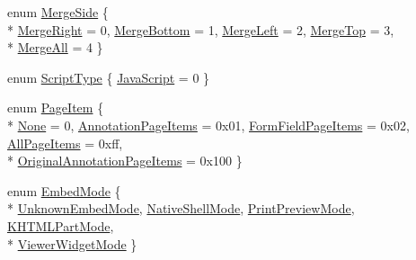 \begin{DoxyCompactItemize}
enum \hyperlink{namespaceOkular_ad98deec425adfb02ba05a78568bccceb}{Merge\+Side} \{ \\*
\hyperlink{namespaceOkular_ad98deec425adfb02ba05a78568bccceba809db1d0fade6720582a2c4f35299e5a}{Merge\+Right} = 0, 
\hyperlink{namespaceOkular_ad98deec425adfb02ba05a78568bccceba3b750f74fdec8486675e9ef46dfe7626}{Merge\+Bottom} = 1, 
\hyperlink{namespaceOkular_ad98deec425adfb02ba05a78568bcccebadd181d06ce9bf13ee34d11b136c891dc}{Merge\+Left} = 2, 
\hyperlink{namespaceOkular_ad98deec425adfb02ba05a78568bccceba7e844b878ae71c6724c6762f26b41b8e}{Merge\+Top} = 3, 
\\*
\hyperlink{namespaceOkular_ad98deec425adfb02ba05a78568bccceba7721ff1c43048d327e3809bdb53e8b9a}{Merge\+All} = 4
 \}
\item 
enum \hyperlink{namespaceOkular_a061f34ff835b2d2142fef28bcfd09325}{Script\+Type} \{ \hyperlink{namespaceOkular_a061f34ff835b2d2142fef28bcfd09325ac61eb96a387ac39266f6eb71948796ea}{Java\+Script} = 0
 \}
\item 
enum \hyperlink{namespaceOkular_ad8955fd515cc3f63a14cdff6723e6c1b}{Page\+Item} \{ \\*
\hyperlink{namespaceOkular_ad8955fd515cc3f63a14cdff6723e6c1ba6969c0e2e87cc779dae8be495740eda6}{None} = 0, 
\hyperlink{namespaceOkular_ad8955fd515cc3f63a14cdff6723e6c1bae381057ad4a79c350a0d4a9aaaaa995b}{Annotation\+Page\+Items} = 0x01, 
\hyperlink{namespaceOkular_ad8955fd515cc3f63a14cdff6723e6c1bac7554622ca47fc955ea25889b6637d3b}{Form\+Field\+Page\+Items} = 0x02, 
\hyperlink{namespaceOkular_ad8955fd515cc3f63a14cdff6723e6c1bad157628664d884c59d2cc11bcdddb76a}{All\+Page\+Items} = 0xff, 
\\*
\hyperlink{namespaceOkular_ad8955fd515cc3f63a14cdff6723e6c1ba1feb4fde97e57698f97d64a2a3b824bb}{Original\+Annotation\+Page\+Items} = 0x100
 \}
\item 
enum \hyperlink{namespaceOkular_adbe21e337d65d3f5f07a441180428ba8}{Embed\+Mode} \{ \\*
\hyperlink{namespaceOkular_adbe21e337d65d3f5f07a441180428ba8a3bb7ac1cc6c88ffdec148c8d6c53a811}{Unknown\+Embed\+Mode}, 
\hyperlink{namespaceOkular_adbe21e337d65d3f5f07a441180428ba8ae06451e28dfb108642b1c3a61a196145}{Native\+Shell\+Mode}, 
\hyperlink{namespaceOkular_adbe21e337d65d3f5f07a441180428ba8a3c886e44dadfdb624559818a85d90b94}{Print\+Preview\+Mode}, 
\hyperlink{namespaceOkular_adbe21e337d65d3f5f07a441180428ba8a22dac18ba4f0fded006c596dfe03ce04}{K\+H\+T\+M\+L\+Part\+Mode}, 
\\*
\hyperlink{namespaceOkular_adbe21e337d65d3f5f07a441180428ba8aebaf7bae8bd4303bad7c4ca29057c472}{Viewer\+Widget\+Mode}
 \}
\end{DoxyCompactItemize}

